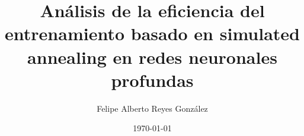 \documentclass[tesis]{tesis-usach}
\title{Análisis de la eficiencia del entrenamiento basado en simulated annealing en redes neuronales profundas}
\author{Felipe Alberto Reyes González}
\date{\today}
\begin{document}
	\renewcommand{\contentsname}{Tabla de contenidos}
	\renewcommand{\refname}{Referencias bibliográficas}
	\renewcommand{\tablename}{Tabla}
	\renewcommand{\appendixname}{Apéndice}
	\renewcommand{\BOthers}[1]{et al.\hbox{}}

	\maketitle
	\makecopyright
	\frontmatter
	\indice
	\mainmatter

	
	


	
	


\end{document}
